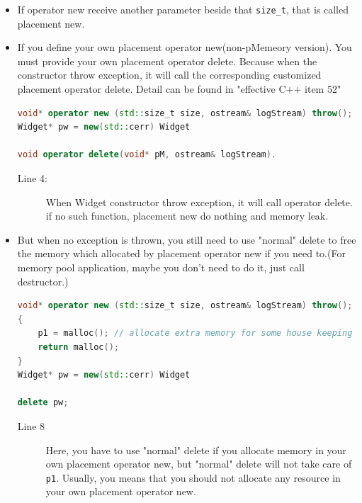 \documentclass[a4paper,11pt,twoside]{book}
\begin{document}
\begin{itemize}
	
	\item If operator new receive another parameter beside that \texttt{size\_t}, that is called placement new.
	
	\item If you define your own placement operator new(non-pMemeory version). You must provide your own placement operator delete. Because when the constructor throw exception, it will call the corresponding customized placement operator delete. Detail can be found in "effective C++ item 52"
\begin{lstlisting}[frame=single, language=c++]
void* operator new (std::size_t size, ostream& logStream) throw();
Widget* pw = new(std::cerr) Widget
	
void operator delete(void* pM, ostream& logStream). 
\end{lstlisting}
\begin{description}
	\item[Line 4:] When Widget constructor throw exception, it will call operator delete. if no such function, placement new do nothing and memory leak.
\end{description}

		\item But when no exception is thrown,  you still need to use "normal" delete to free the memory which allocated by placement operator new if you need to.(For memory pool application, maybe you don't need to do it, just call destructor.)

\begin{lstlisting}[frame=single, language=c++]
void* operator new (std::size_t size, ostream& logStream) throw();
{
	p1 = malloc(); // allocate extra memory for some house keeping work.
	return malloc();
}
Widget* pw = new(std::cerr) Widget
	
delete pw;
\end{lstlisting}		
\begin{description}
	\item[Line 8] Here, you have to use "normal" delete if you allocate memory in your own placement operator new, but "normal" delete will not take care of \texttt{p1}. Usually, you means that you should not allocate any resource in your own placement operator new.
\end{description}


\end{itemize}
\end{document}
